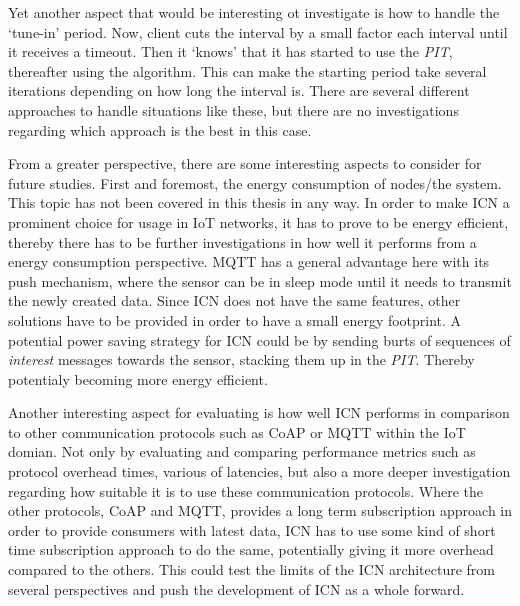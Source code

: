Yet another aspect that would be interesting ot investigate is how to handle the `tune-in' period. Now, client cuts the interval by a small factor each interval until it receives a timeout. Then it `knows' that it has started to use the \textit{PIT}, thereafter using the algorithm. This can make the starting period take several iterations depending on how long the interval is. There are several different approaches to handle situations like these, but there are no investigations regarding which approach is the best in this case.

From a greater perspective, there are some interesting aspects to consider for future studies. First and foremost, the energy consumption of nodes/the system. This topic has not been covered in this thesis in any way. In order to make ICN a prominent choice for usage in IoT networks, it has to prove to be energy efficient, thereby there has to be further investigations in how well it performs from a energy consumption perspective. MQTT has a general advantage here with its push mechanism, where the sensor can be in sleep mode until it needs to transmit the newly created data. Since ICN does not have the same features, other solutions have to be provided in order to have a small energy footprint. A potential power saving strategy for ICN could be by sending burts of sequences of \textit{interest} messages towards the sensor, stacking them up in the \textit{PIT}. Thereby potentialy becoming more energy efficient. 

Another interesting aspect for evaluating is how well ICN performs in comparison to other communication protocols such as CoAP or MQTT within the IoT domian. Not only by evaluating and comparing performance metrics such as protocol overhead times, various of latencies, but also a more deeper investigation regarding how suitable it is to use these communication protocols. Where the other protocols, CoAP and MQTT, provides a long term subscription approach in order to provide consumers with latest data, ICN has to use some kind of short time subscription approach to do the same, potentially giving it more overhead compared to the others.
This could test the limits of the ICN architecture from several perspectives and push the development of ICN as a whole forward.


%
%



